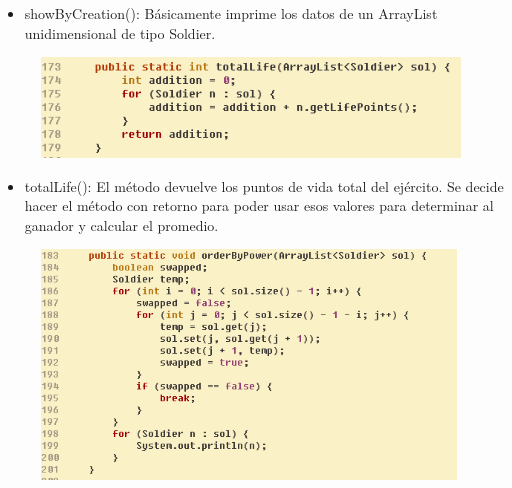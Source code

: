 \documentclass{article}
\begin{document}
	\begin{itemize}	
		\item showByCreation(): Básicamente imprime los datos de un ArrayList unidimensional de tipo Soldier.
	\end{itemize}
	
	\begin{figure}[H]
		\centering
		\includegraphics[width=0.99\textwidth,keepaspectratio]{img/totalLife.png}
	\end{figure}	
	
	
	\begin{itemize}	
		\item totalLife(): El método devuelve los puntos de vida total del ejército. Se decide hacer el método con retorno para poder usar esos valores para determinar al ganador y calcular el promedio.
	\end{itemize}
		
		
		
		
		
	\begin{figure}[H]
		\centering
		\includegraphics[width=0.98\textwidth,keepaspectratio]{img/orderByPower.png}
	\end{figure}
	
\end{document}
